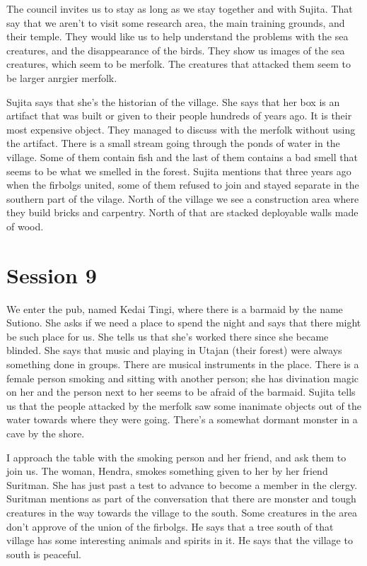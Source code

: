 \documentclass[10pt,a4paper,twoside,openany,hidelinks]{book}
\begin{document}
The council invites us to stay as long as we stay together and with Sujita. That say that we aren't to visit some research area, the main training grounds, and their temple. They would like us to help understand the problems with the sea creatures, and the disappearance of the birds. They show us images of the sea creatures, which seem to be merfolk. The creatures that attacked them seem to be larger anrgier merfolk.

Sujita says that she's the historian of the village. She says that her box is an artifact that was built or given to their people hundreds of years ago. It is their most expensive object. They managed to discuss with the merfolk without using the artifact. There is a small stream going through the ponds of water in the village. Some of them contain fish and the last of them contains a bad smell that seems to be what we smelled in the forest. Sujita mentions that three years ago when the firbolgs united, some of them refused to join and stayed separate in the southern part of the vilage.
North of the village we see a construction area where they build bricks and carpentry. North of that are stacked deployable walls made of wood.

\chapter*{Session 9}

We enter the pub, named Kedai Tingi, where there is a barmaid by the name Sutiono. She asks if we need a place to spend the night and says that there might be such place for us. She tells us that she's worked there since she became blinded. She says that music and playing in Utajan (their forest) were always something done in groups. There are musical instruments in the place. There is a female person smoking and sitting with another person; she has divination magic on her and the person next to her seems to be afraid of the barmaid.
Sujita tells us that the people attacked by the merfolk saw some inanimate objects out of the water towards where they were going. There's a somewhat dormant monster in a cave by the shore.

I approach the table with the smoking person and her friend, and ask them to join us. The woman, Hendra, smokes something given to her by her friend Suritman. She has just past a test to advance to become a member in the clergy. Suritman mentions as part of the conversation that there are monster and tough creatures in the way towards the village to the south. Some creatures in the area don't approve of the union of the firbolgs. He says that a tree south of that village has some interesting animals and spirits in it. He says that the village to south is peaceful.
\end{document}
